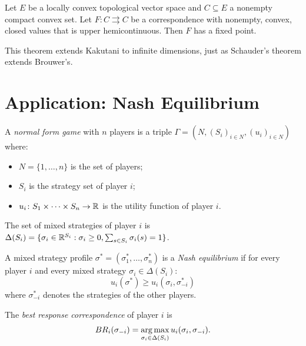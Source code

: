 \begin{theorem}
\label{thm:glicksberg-fan}
Let $E$ be a locally convex topological vector space and $C \subseteq E$ a nonempty
compact convex set. Let $F\colon C \rightrightarrows C$ be a correspondence with nonempty,
convex, closed values that is upper hemicontinuous. Then $F$ has a fixed point.
\end{theorem}

\begin{remark}
This theorem extends Kakutani to infinite dimensions, just as Schauder's theorem extends
Brouwer's.
\end{remark}

\section{Application: Nash Equilibrium}

\begin{definition}
A \emph{normal form game} with $n$ players is a triple
$\Gamma = (N, (S_i)_{i \in N}, (u_i)_{i \in N})$ where:
\begin{itemize}
  \item $N = \{1, \ldots, n\}$ is the set of players;
  \item $S_i$ is the strategy set of player $i$;
  \item $u_i\colon S_1 \times \cdots \times S_n \to \mathbb{R}$ is the utility function of
    player $i$.
\end{itemize}
The set of mixed strategies of player $i$ is $\Delta(S_i) = \{\sigma_i \in \mathbb{R}^{S_i}
: \sigma_i \geq 0, \sum_{s \in S_i} \sigma_i(s) = 1\}$.
\end{definition}

\begin{definition}
A mixed strategy profile $\sigma^* = (\sigma_1^*, \ldots, \sigma_n^*)$ is a
\emph{Nash equilibrium} if for every player $i$ and every mixed strategy
$\sigma_i \in \Delta(S_i)$:
\[
  u_i(\sigma^*) \geq u_i(\sigma_i, \sigma_{-i}^*)
\]
where $\sigma_{-i}^*$ denotes the strategies of the other players.
\end{definition}

\begin{definition}
The \emph{best response correspondence} of player $i$ is
\[
  BR_i(\sigma_{-i}) = \operatorname*{arg\,max}_{\sigma_i \in \Delta(S_i)} u_i(\sigma_i, \sigma_{-i}).
\]
\end{definition}

